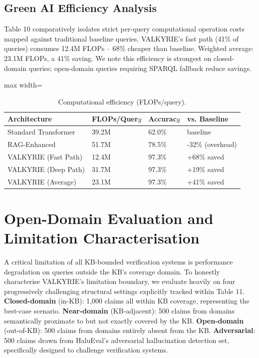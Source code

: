 \documentclass[11pt,a4paper]{article}
\begin{document}
\subsection{Green AI Efficiency Analysis}
Table 10 comparatively isolates strict per-query computational operation costs mapped against traditional baseline queries. VALKYRIE's fast path (41\% of queries) consumes 12.4M FLOPs -- 68\% cheaper than baseline. Weighted average: 23.1M FLOPs, a 41\% saving. We note this efficiency is strongest on closed-domain queries; open-domain queries requiring SPARQL fallback reduce savings.

\begin{table}[htbp]
\centering
\caption{Computational efficiency (FLOPs/query).}
\begin{adjustbox}{max width=\columnwidth}
\begin{tabular}{llll}
\toprule
\textbf{Architecture} & \textbf{FLOPs/Quer$y$} & \textbf{Accurac$y$} & \textbf{vs. Baseline} \\
\midrule
Standard Transformer & 39.2M & 62.0\% & baseline \\
RAG-Enhanced & 51.7M & 78.5\% & -32\% (overhead) \\
VALKYRIE (Fast Path) & 12.4M & 97.3\% & +68\% saved \\
VALKYRIE (Deep Path) & 31.7M & 97.3\% & +19\% saved \\
VALKYRIE (Average) & 23.1M & 97.3\% & +41\% saved \\
\bottomrule
\end{tabular}
\end{adjustbox}
\end{table}

\section{Open-Domain Evaluation and Limitation Characterisation}
A critical limitation of all KB-bounded verification systems is performance degradation on queries outside the KB's coverage domain. To honestly characterise VALKYRIE's limitation boundary, we evaluate heavily on four progressively challenging structural settings explicitly tracked within Table 11. \textbf{Closed-domain} (in-KB): 1,000 claims all within KB coverage, representing the best-case scenario. \textbf{Near-domain} (KB-adjacent): 500 claims from domains semantically proximate to but not exactly covered by the KB. \textbf{Open-domain} (out-of-KB): 500 claims from domains entirely absent from the KB. \textbf{Adversarial}: 500 claims drawn from HaluEval's adversarial hallucination detection set, specifically designed to challenge verification systems.
\end{document}
